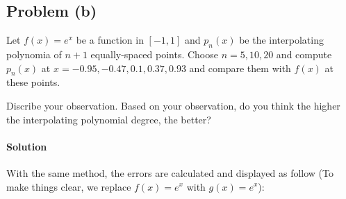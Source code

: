 \documentclass[UTF8,hyperref]{article}
\begin{document}
\subsection{Problem (b)}
\par Let $f(x)=e^x$ be a function in $[-1,1]$ and $p_n(x)$ be the interpolating polynomia of $n+1$ equally-spaced points. Choose $n=5,10,20$ and compute $p_n(x)$ at $x=-0.95,-0.47, 0.1,0.37,0.93$ and compare them with $f(x)$ at these points.

\par Discribe your observation. Based on your observation, do you think the higher the interpolating polynomial degree, the better?
\paragraph{Solution} With the same method, the errors are calculated and displayed as follow (To make things clear, we replace $f(x)=e^x$ with $g(x)=e^x$):
\end{document}

